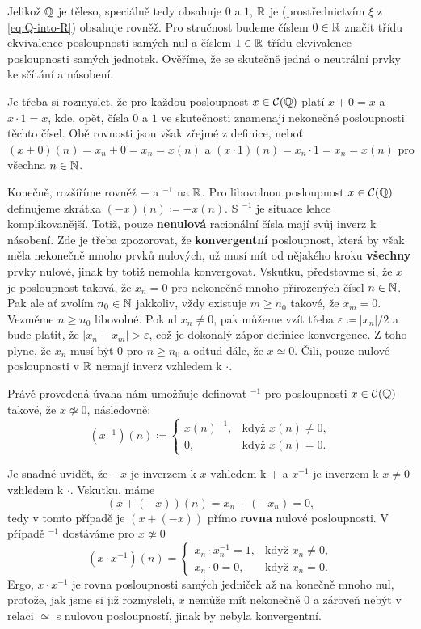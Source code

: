 Jelikož $\mathbb{Q}$ je těleso, speciálně tedy obsahuje $0$ a $1$, $\mathbb{R}$ je
(prostřednictvím $\xi$ z \eqref{eq:Q-into-R}) obsahuje rovněž. Pro stručnost
budeme číslem $0 \in \mathbb{R}$ značit třídu ekvivalence posloupnosti samých nul a
číslem $1 \in \mathbb{R}$ třídu ekvivalence posloupnosti samých jednotek. Ověříme, že se
skutečně jedná o neutrální prvky ke sčítání a násobení.

Je třeba si rozmyslet, že pro každou posloupnost $x \in \mathcal{C}(\mathbb{Q})$ platí
$x + 0 = x$ a $x \cdot 1 = x$, kde, opět, čísla $0$ a $1$ ve skutečnosti
znamenají nekonečné posloupnosti těchto čísel. Obě rovnosti jsou však zřejmé z
definice, neboť $(x+0)(n) = x_n + 0 = x_n = x(n)$ a $(x \cdot 1)(n) = x_n \cdot
1 = x_n = x(n)$ pro všechna $n \in \mathbb{N}$.

Konečně, rozšíříme rovněž $-$ a $^{-1}$ na $\mathbb{R}$. Pro libovolnou posloupnost $x
\in \mathcal{C}(\mathbb{Q})$ definujeme zkrátka $(-x)(n) \coloneqq -x(n)$. S $^{-1}$ je
situace lehce komplikovanější. Totiž, pouze \textbf{nenulová} racionální čísla
mají svůj inverz k násobení. Zde je třeba zpozorovat, že \textbf{konvergentní}
posloupnost, která by však měla nekonečně mnoho prvků nulových, už musí mít od
nějakého kroku \textbf{všechny} prvky nulové, jinak by totiž nemohla
konvergovat. Vskutku, představme si, že $x$ je posloupnost taková, že $x_n = 0$
pro nekonečně mnoho přirozených čísel $n \in \mathbb{N}$. Pak ale ať zvolím $n_0 \in \mathbb{N}$
jakkoliv, vždy existuje $m \geq n_0$ takové, že $x_m = 0$. Vezměme $n \geq n_0$
libovolné. Pokud $x_n \neq 0$, pak můžeme vzít třeba $\varepsilon \coloneqq
|x_n| / 2$ a bude platit, že $|x_n - x_m| > \varepsilon$, což je dokonalý zápor
\hyperref[def:konvergentni-posloupnost]{definice konvergence}. Z toho plyne, že
$x_n$ musí být $0$ pro $n \geq n_0$ a odtud dále, že $x \simeq 0$. Čili, pouze
nulové posloupnosti v $\mathbb{R}$ nemají inverz vzhledem k $ \cdot $.

Právě provedená úvaha nám umožňuje definovat $^{-1}$ pro posloupnosti $x \in
\mathcal{C}(\mathbb{Q})$ takové, že $x \not\simeq 0$, následovně:
\[
 (x^{-1})(n) \coloneqq \begin{cases}
  x(n)^{-1},& \text{když } x(n) \neq 0,\\
  0, &\text{když } x(n) = 0.
 \end{cases}
\]
 
Je snadné uvidět, že $-x$ je inverzem k $x$ vzhledem k $+$ a $x^{-1}$ je
inverzem k $x \neq 0$ vzhledem k $ \cdot $. Vskutku, máme
\[
 (x + (-x))(n) = x_n + (-x_n) = 0,
\]
tedy v tomto případě je $(x + (-x))$ přímo \textbf{rovna} nulové posloupnosti. V
případě $^{-1}$ dostáváme pro $x \not\simeq 0$
\[
 (x \cdot x^{-1})(n) = \begin{cases}
  x_n \cdot x_n^{-1} = 1,& \text{když } x_n \neq 0,\\
  x_n \cdot 0 = 0,& \text{když } x_n = 0.
 \end{cases}
\]
Ergo, $x \cdot x^{-1}$ je rovna posloupnosti samých jedniček až na konečně mnoho
nul, protože, jak jsme si již rozmysleli, $x$ nemůže mít nekonečně $0$ a zároveň
nebýt v relaci $ \simeq $ s nulovou posloupností, jinak by nebyla konvergentní.

